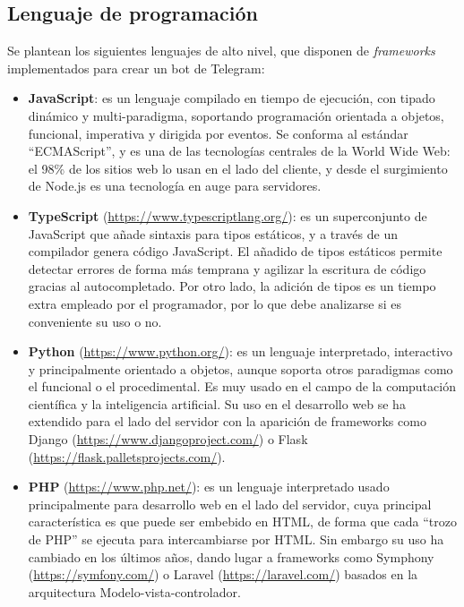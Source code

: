 \subsection{Lenguaje de programación}
Se plantean los siguientes lenguajes de alto nivel, que disponen de \textit{frameworks} implementados para crear un bot de Telegram:

\begin{itemize}
    \item \textbf{JavaScript}: es un lenguaje compilado en tiempo de ejecución, con tipado dinámico y multi-paradigma, soportando programación orientada a objetos, funcional, imperativa y dirigida por eventos\cite{wiki:JavaScript}. Se conforma al estándar ``ECMAScript'', y es una de las tecnologías centrales de la World Wide Web: el 98\% de los sitios web lo usan en el lado del cliente\cite{javascriptUsage}, y desde el surgimiento de Node.js es una tecnología en auge para servidores.
    \item \textbf{TypeScript} (\url{https://www.typescriptlang.org/}): es un superconjunto de JavaScript que añade sintaxis para tipos estáticos, y a través de un compilador genera código JavaScript\cite{typescriptWeb}. El añadido de tipos estáticos permite detectar errores de forma más temprana y agilizar la escritura de código gracias al autocompletado. Por otro lado, la adición de tipos es un tiempo extra empleado por el programador, por lo que debe analizarse si es conveniente su uso o no.
    \item \textbf{Python} (\url{https://www.python.org/}): es un lenguaje interpretado, interactivo y principalmente orientado a objetos, aunque soporta otros paradigmas como el funcional o el procedimental\cite{pythonFAQGeneral}. Es muy usado en el campo de la computación científica y la inteligencia artificial. Su uso en el desarrollo web se ha extendido para el lado del servidor con la aparición de frameworks como Django (\url{https://www.djangoproject.com/}) o Flask (\url{https://flask.palletsprojects.com/}).
    \item \textbf{PHP} (\url{https://www.php.net/}): es un lenguaje interpretado usado principalmente para desarrollo web en el lado del servidor, cuya principal característica es que puede ser embebido en HTML, de forma que cada ``trozo de PHP'' se ejecuta para intercambiarse por HTML. Sin embargo su uso ha cambiado en los últimos años, dando lugar a frameworks como Symphony (\url{https://symfony.com/}) o Laravel (\url{https://laravel.com/}) basados en la arquitectura Modelo-vista-controlador.
\end{itemize}

